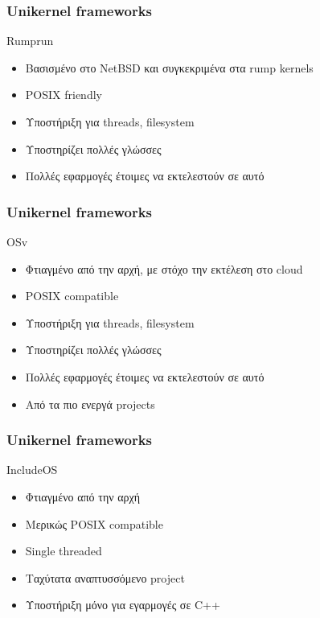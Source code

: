 \documentclass[red,slidestop,notes,compress,mathserif]{beamer}
\begin{document}
\begin{frame}
\frametitle{Unikernel frameworks}
	\begin{block}{Rumprun}
		\begin{itemize}
			\item Βασισμένο στο NetBSD και συγκεκριμένα στα rump kernels 
			\item POSIX friendly
			\item Υποστήριξη για threads, filesystem
			\item Υποστηρίζει πολλές γλώσσες
			\item Πολλές εφαρμογές έτοιμες να εκτελεστούν σε αυτό
		\end{itemize}
	\end{block}
\end{frame}
\begin{frame}
\frametitle{Unikernel frameworks}
	\begin{block}{OSv}
		\begin{itemize}
			\item Φτιαγμένο από την αρχή, με στόχο την εκτέλεση στο cloud
			\item POSIX compatible
			\item Υποστήριξη για threads, filesystem
			\item Υποστηρίζει πολλές γλώσσες
			\item Πολλές εφαρμογές έτοιμες να εκτελεστούν σε αυτό
			\item Από τα πιο ενεργά projects
		\end{itemize}
	\end{block}
\end{frame}
\begin{frame}
\frametitle{Unikernel frameworks}
	\begin{block}{IncludeOS}
		\begin{itemize}
			\item Φτιαγμένο από την αρχή
			\item Μερικώς POSIX compatible
			\item Single threaded
			\item Ταχύτατα αναπτυσσόμενο project
			\item Υποστήριξη μόνο για εγαρμογές σε C++
		\end{itemize}
	\end{block}
\end{frame}
\end{document}
